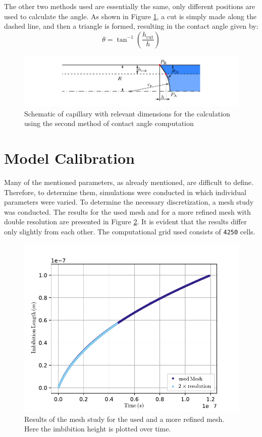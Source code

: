 The other two methods used are essentially the same, only different positions are used to calculate the angle. As shown in Figure \ref{fig: CA_Method2}, a cut is simply made along the dashed line, and then a triangle is formed, resulting in the contact angle given by:
\begin{equation}
    \theta = \tan^{-1}\left(\frac{h_{\mathrm{cut}}}{h}\right)
\end{equation}

\begin{figure}[h]
    \centering
    \includegraphics[width=.95\textwidth]{Pictures/CA_CALCMEthod2.pdf}
    \caption{Schematic of capillary with relevant dimensions for the calculation using the second method of contact angle computation}
    \label{fig: CA_Method2}
\end{figure}



\section{Model Calibration}
Many of the mentioned parameters, as already mentioned, are difficult to define. Therefore, to determine them, simulations were conducted in which individual parameters were varied. To determine the necessary discretization, a mesh study was conducted. The results for the used mesh and for a more refined mesh with double resolution are presented in Figure \ref*{fig: Mesh_Study}. It is evident that the results differ only slightly from each other. The computational grid used consists of \texttt{4250} cells. 

\begin{figure}[h]
    \centering
    \includegraphics[width=.95\textwidth]{Pictures/Mesh_Study.pdf}
    \caption{Results of the mesh study for the used and a more refined mesh. Here the imbibition height is plotted over time.}
    \label{fig: Mesh_Study}
\end{figure}

